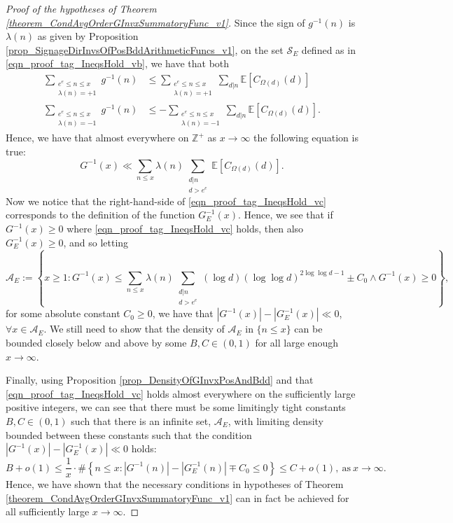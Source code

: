 \documentclass[11pt,reqno,a4letter]{article}
\numberwithin{figure}{section}
\numberwithin{table}{section}
\theoremstyle{plain}
\numberwithin{theorem}{section}
\theoremstyle{definition}
\begin{document}
\begin{proof}[Proof of the hypotheses of Theorem \ref{theorem_CondAvgOrderGInvxSummatoryFunc_v1}]
Since the sign of $g^{-1}(n)$ is $\lambda(n)$ as given by 
Proposition \ref{prop_SignageDirInvsOfPosBddArithmeticFuncs_v1}, 
on the set $\mathcal{S}_E$ defined as in \eqref{eqn_proof_tag_IneqsHold_vb}, we have that both 
\begin{align*} 
\sum_{\substack{e^e \leq n \leq x \\ \lambda(n) = +1}} g^{-1}(n) & \leq 
     \sum_{\substack{e^e \leq n \leq x \\ \lambda(n) = +1}} \sum_{d|n} \mathbb{E}[C_{\Omega(d)}(d)] \\ 
\sum_{\substack{e^e \leq n \leq x \\ \lambda(n) = -1}} g^{-1}(n) & \leq 
     -\sum_{\substack{e^e \leq n \leq x \\ \lambda(n) = -1}} \sum_{d|n} \mathbb{E}[C_{\Omega(d)}(d)]. 
\end{align*} 
Hence, we have that almost everywhere on $\mathbb{Z}^{+}$ as $x \rightarrow \infty$ the 
following equation is true: 
\begin{equation} 
\label{eqn_proof_tag_IneqsHold_vc} 
G^{-1}(x) \ll \sum_{n \leq x} \lambda(n) \sum_{\substack{d|n \\ d > e^e}} \mathbb{E}[C_{\Omega(d)}(d)]. 
\end{equation} 
Now we notice that the right-hand-side of \eqref{eqn_proof_tag_IneqsHold_vc} corresponds to the definition of 
the function $G_E^{-1}(x)$. Hence, we see that if $G^{-1}(x) \geq 0$ where 
\eqref{eqn_proof_tag_IneqsHold_vc} holds, then also 
$G_E^{-1}(x) \geq 0$, and so letting 
\[
\mathcal{A}_E := \left\{x \geq 1: 
     G^{-1}(x) \leq \sum_{n \leq x} \lambda(n) \sum_{\substack{d|n \\ d > e^e}} 
     (\log d) (\log\log d)^{2 \log\log d - 1} \pm C_0 
     \wedge G^{-1}(x) \geq 0 
     \right\}, 
\]
for some absolute constant $C_0 \geq 0$, 
we have that $|G^{-1}(x)| - |G_E^{-1}(x)| \ll 0$, $\forall x \in \mathcal{A}_E$. 
We still need to show that the density of $\mathcal{A}_E$ in $\{n \leq x\}$ can be bounded closely 
below and above by some $B, C \in (0, 1)$ for all large enough $x \rightarrow \infty$. 

Finally, using Proposition \ref{prop_DensityOfGInvxPosAndBdd} and that 
\eqref{eqn_proof_tag_IneqsHold_vc} holds almost everywhere on the sufficiently large 
positive integers, 
we can see that there must be some limitingly tight constants 
$B, C \in (0, 1)$ such that there is an infinite set, $\mathcal{A}_E$, with 
limiting density bounded between these constants such that the condition 
$|G^{-1}(x)| - |G_E^{-1}(x)| \ll 0$ holds: 
\[
B + o(1) \leq \frac{1}{x} \cdot \#\left\{n \leq x: |G^{-1}(n)| - |G_E^{-1}(n)| \mp C_0 \leq 0\right\} \leq C + o(1), 
     \mathrm{\ as\ } x \rightarrow \infty. 
\]
Hence, we have shown that the necessary conditions in hypotheses of 
Theorem \ref{theorem_CondAvgOrderGInvxSummatoryFunc_v1} can in fact be achieved for all 
sufficiently large $x \rightarrow \infty$. 
\end{proof} 
\end{document}
